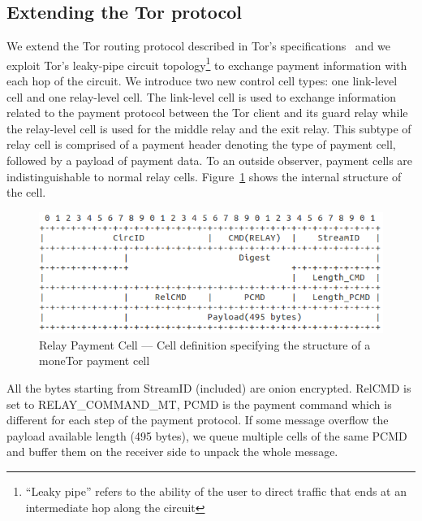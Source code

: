 
\subsection{Extending the Tor protocol}

We extend the Tor routing protocol described in Tor's
specifications~\cite{dingledine2018tor} and we exploit Tor's leaky-pipe circuit
topology\footnote{``Leaky pipe'' refers to the ability of the user to direct
  traffic that ends at an intermediate hop along the circuit} to exchange
payment information with each hop of the circuit. We introduce two new control
cell types: one link-level cell and one relay-level cell. The link-level cell is
used to exchange information related to the payment protocol between the Tor
client and its guard relay while the relay-level cell is used for the middle
relay and the exit relay. This subtype of relay cell is comprised of a payment
header denoting the type of payment cell, followed by a payload of payment
data. To an outside observer, payment cells are indistinguishable to normal
relay cells. Figure~\ref{fig:relay_command_mt_structure} shows the internal structure of the cell.
\begin{figure}[h]
    \centering
    \includegraphics[scale=0.38]{images/payment_cell_header.png}
    \caption{Relay Payment Cell --- Cell definition specifying the structure of
      a moneTor payment cell}
\label{fig:relay_command_mt_structure}
\end{figure}

All the bytes starting from StreamID (included) are onion encrypted. RelCMD is set to RELAY\_COMMAND\_MT, PCMD is the payment command which is different for each step of the payment protocol. If some message overflow the payload available length (495 bytes), we queue multiple cells of the same PCMD and buffer them on the receiver side to unpack the whole message.

